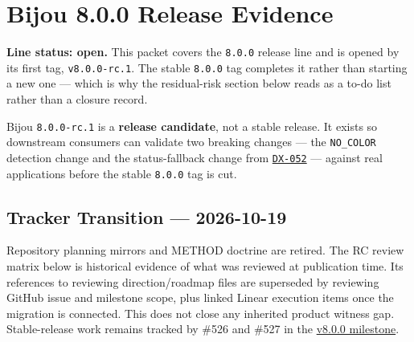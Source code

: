 \chapter{Bijou 8.0.0 Release Evidence}\label{record-262}

\smallskip

\textbf{Line status: open.} This packet covers the \texttt{8\allowbreak{}.\allowbreak{}0\allowbreak{}.\allowbreak{}0} release line and is opened by its first tag, \texttt{v\allowbreak{}8\allowbreak{}.\allowbreak{}0\allowbreak{}.\allowbreak{}0\allowbreak{}-\allowbreak{}r\allowbreak{}c\allowbreak{}.\allowbreak{}1}. The stable \texttt{8\allowbreak{}.\allowbreak{}0\allowbreak{}.\allowbreak{}0} tag completes it rather than starting a new one --- which is why the residual-risk section below reads as a to-do list rather than a closure record.

Bijou \texttt{8\allowbreak{}.\allowbreak{}0\allowbreak{}.\allowbreak{}0\allowbreak{}-\allowbreak{}r\allowbreak{}c\allowbreak{}.\allowbreak{}1} is a \textbf{release candidate}, not a stable release. It exists so downstream consumers can validate two breaking changes --- the \texttt{N\allowbreak{}O\allowbreak{}\_\allowbreak{}C\allowbreak{}O\allowbreak{}L\allowbreak{}O\allowbreak{}R} detection change and the status-fallback change from \href{https://github.com/flyingrobots/bijou/blob/cbd70612140e7a450d764b3c7be1c6af878b99bc/docs/design/DX-052-no-color-is-not-a-capability.md}{\texttt{D\allowbreak{}X\allowbreak{}-\allowbreak{}0\allowbreak{}5\allowbreak{}2}} --- against real applications before the stable \texttt{8\allowbreak{}.\allowbreak{}0\allowbreak{}.\allowbreak{}0} tag is cut.

\section{Tracker Transition --- 2026-10-19}\label{record-262-tracker-transition-2026-10-19}

Repository planning mirrors and METHOD doctrine are retired. The RC review matrix below is historical evidence of what was reviewed at publication time. Its references to reviewing direction/roadmap files are superseded by reviewing GitHub issue and milestone scope, plus linked Linear execution items once the migration is connected. This does not close any inherited product witness gap. Stable-release work remains tracked by \#526 and \#527 in the \href{https://github.com/flyingrobots/bijou/milestone/6}{v8.0.0 milestone}.

